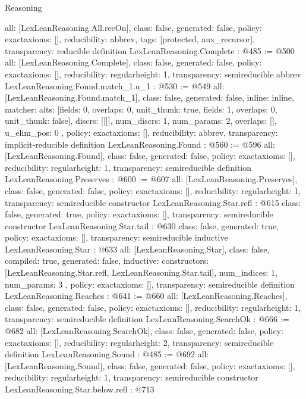 \begin{lexlean}{Reasoning}
\begin{coremodule}
{  all: [LexLeanReasoning.All.recOn],
  class: false,
  generated: false,
  policy: exact{axioms: []},
  reducibility: abbrev{},
  tags: [protected, aux_recursor],
  transparency: reducible
}
definition LexLeanReasoning.Complete : @485 := @500 {
  all: [LexLeanReasoning.Complete],
  class: false,
  generated: false,
  policy: exact{axioms: []},
  reducibility: regular{height: 1},
  transparency: semireducible
}
abbrev LexLeanReasoning.Found.match_1.{u_1} : @530 := @549 {
  all: [LexLeanReasoning.Found.match_1],
  class: false,
  generated: false,
  inline: inline,
  matcher: {
    alts: [{fields: 0, overlaps: 0, unit_thunk: true}, {fields: 1, overlaps: 0, unit_thunk: false}],
    discrs: [[]],
    num_discrs: 1,
    num_params: 2,
    overlaps: [],
    u_elim_pos: 0
  },
  policy: exact{axioms: []},
  reducibility: abbrev{},
  transparency: implicit-reducible
}
definition LexLeanReasoning.Found : @560 := @596 {
  all: [LexLeanReasoning.Found],
  class: false,
  generated: false,
  policy: exact{axioms: []},
  reducibility: regular{height: 1},
  transparency: semireducible
}
definition LexLeanReasoning.Preserves : @600 := @607 {
  all: [LexLeanReasoning.Preserves],
  class: false,
  generated: false,
  policy: exact{axioms: []},
  reducibility: regular{height: 1},
  transparency: semireducible
}
constructor LexLeanReasoning.Star.refl : @615 {
  class: false,
  generated: true,
  policy: exact{axioms: []},
  transparency: semireducible
}
constructor LexLeanReasoning.Star.tail : @630 {
  class: false,
  generated: true,
  policy: exact{axioms: []},
  transparency: semireducible
}
inductive LexLeanReasoning.Star : @633 {
  all: [LexLeanReasoning.Star],
  class: false,
  compiled: true,
  generated: false,
  inductive: {
    constructors: [LexLeanReasoning.Star.refl, LexLeanReasoning.Star.tail],
    num_indices: 1,
    num_params: 3
  },
  policy: exact{axioms: []},
  transparency: semireducible
}
definition LexLeanReasoning.Reaches : @641 := @660 {
  all: [LexLeanReasoning.Reaches],
  class: false,
  generated: false,
  policy: exact{axioms: []},
  reducibility: regular{height: 1},
  transparency: semireducible
}
definition LexLeanReasoning.SearchOk : @666 := @682 {
  all: [LexLeanReasoning.SearchOk],
  class: false,
  generated: false,
  policy: exact{axioms: []},
  reducibility: regular{height: 2},
  transparency: semireducible
}
definition LexLeanReasoning.Sound : @485 := @692 {
  all: [LexLeanReasoning.Sound],
  class: false,
  generated: false,
  policy: exact{axioms: []},
  reducibility: regular{height: 1},
  transparency: semireducible
}
constructor LexLeanReasoning.Star.below.refl : @713 {
}
\end{coremodule}
\end{lexlean}
